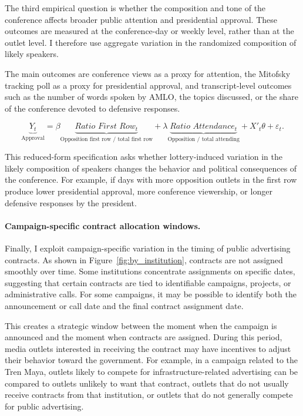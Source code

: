 The third empirical question is whether the composition and tone of the conference affects broader public attention and presidential approval. These outcomes are measured at the conference-day or weekly level, rather than at the outlet level. I therefore use aggregate variation in the randomized composition of likely speakers.

The main outcomes are conference views as a proxy for attention, the Mitofsky tracking poll as a proxy for presidential approval, and transcript-level outcomes such as the number of words spoken by AMLO, the topics discussed, or the share of the conference devoted to defensive responses.

\[
\underbrace{Y_t}_{\text{Approval}}
=
\beta
\underbrace{\textit{Ratio First Row}_{t}}_{\text{Opposition first row / total first row}}
+
\lambda
\underbrace{\textit{Ratio Attendance}_{t}}_{\text{Opposition / total attending}}
+
X'_t\theta
+
\varepsilon_t.
\]

This reduced-form specification asks whether lottery-induced variation in the likely composition of speakers changes the behavior and political consequences of the conference. For example, if days with more opposition outlets in the first row produce lower presidential approval, more conference viewership, or longer defensive responses by the president.

\paragraph{Campaign-specific contract allocation windows.}

Finally, I exploit campaign-specific variation in the timing of public advertising contracts. As shown in Figure~\ref{fig:by_institution}, contracts are not assigned smoothly over time. Some institutions concentrate assignments on specific dates, suggesting that certain contracts are tied to identifiable campaigns, projects, or administrative calls. For some campaigns, it may be possible to identify both the announcement or call date and the final contract assignment date.

This creates a strategic window between the moment when the campaign is announced and the moment when contracts are assigned. During this period, media outlets interested in receiving the contract may have incentives to adjust their behavior toward the government. For example, in a campaign related to the Tren Maya, outlets likely to compete for infrastructure-related advertising can be compared to outlets unlikely to want that contract, outlets that do not usually receive contracts from that institution, or outlets that do not generally compete for public advertising.

